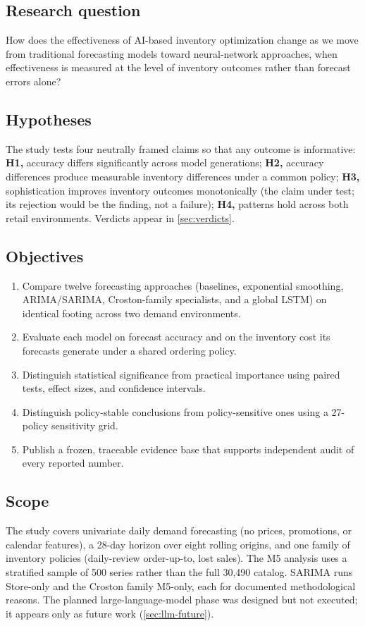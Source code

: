 \subsection{Research question}
\label{sec:rq}
How does the effectiveness of AI-based inventory optimization change as we move
from traditional forecasting models toward neural-network approaches, when
effectiveness is measured at the level of inventory outcomes rather than
forecast errors alone?

\subsection{Hypotheses}
\label{sec:hypotheses}
The study tests four neutrally framed claims so that any outcome is
informative: \textbf{H1,} accuracy differs significantly across model
generations; \textbf{H2,} accuracy differences produce measurable inventory
differences under a common policy; \textbf{H3,} sophistication improves
inventory outcomes monotonically (the claim under test; its rejection would be
the finding, not a failure); \textbf{H4,} patterns hold across both retail
environments. Verdicts appear in \cref{sec:verdicts}.

\subsection{Objectives}
\label{sec:objectives}
\begin{enumerate}
\item Compare twelve forecasting approaches (baselines, exponential
smoothing, ARIMA/SARIMA, Croston-family specialists, and a global LSTM) on
identical footing across two demand environments.
\item Evaluate each model on forecast accuracy and on the inventory cost its
forecasts generate under a shared ordering policy.
\item Distinguish statistical significance from practical importance using
paired tests, effect sizes, and confidence intervals.
\item Distinguish policy-stable conclusions from policy-sensitive ones using a
27-policy sensitivity grid.
\item Publish a frozen, traceable evidence base that supports independent
audit of every reported number.
\end{enumerate}

\subsection{Scope}
\label{sec:scope}
The study covers univariate daily demand forecasting (no prices, promotions, or
calendar features), a 28-day horizon over eight rolling origins, and one
family of inventory policies (daily-review order-up-to, lost sales). The M5
analysis uses a stratified sample of 500 series rather than the full 30,490
catalog. SARIMA runs Store-only and the Croston family M5-only, each for
documented methodological reasons. The planned large-language-model phase was
designed but not executed; it appears only as future work (\cref{sec:llm-future}).


